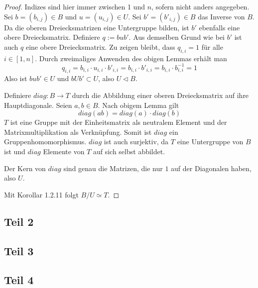 \documentclass[10pt,a4paper]{article}
\begin{document}
\begin{proof}
  Indizes sind hier immer zwischen 1 und $n$, sofern nicht anders angegeben.
  Sei $b = (b_{i, j}) \in B$ und $u = (u_{i, j}) \in U$.
  Sei $b' = (b'_{i, j}) \in B$ das Inverse von $B$.
  Da die oberen Dreiecksmatrizen eine Untergruppe bilden, ist $b'$ ebenfalls eine obere Dreiecksmatrix.
  Definiere $q := bub'$.
  Aus demselben Grund wie bei $b'$ ist auch $q$ eine obere Dreiecksmatrix.
  Zu zeigen bleibt, dass $q_{i, i} = 1$ für alle $i \in [1, n]$.
  Durch zweimaliges Anwenden des obigen Lemmas erhält man
  \begin{equation}
    q_{i, i} = b_{i, i} \cdot u_{i, i} \cdot b'_{i, i} = b_{i, i} \cdot b'_{i, i} = b_{i, i} \cdot b_{i, i}^{-1} = 1
  \end{equation}
  Also ist $bub' \in U$ und $bUb' \subset U$, also $U \triangleleft B$.

  Definiere $diag : B \rightarrow T$ durch die Abbildung einer oberen Dreiecksmatrix auf ihre Hauptdiagonale.
  Seien $a, b \in B$.
  Nach obigem Lemma gilt
  \begin{equation}
    diag(ab) = diag(a) \cdot diag(b)
  \end{equation}
  $T$ ist eine Gruppe mit der Einheitsmatrix als neutralem Element und der Matrixmultiplikation als Verknüpfung.
  Somit ist $diag$ ein Gruppenhomomorphismus.
  $diag$ ist auch surjektiv, da $T$ eine Untergruppe von $B$ ist und $diag$ Elemente von $T$ auf sich selbst abbildet.

  Der Kern von $diag$ sind genau die Matrizen, die nur $1$ auf der Diagonalen haben, also $U$.

  Mit Korollar 1.2.11 folgt $B / U \simeq T$.
\end{proof}

\subsection{Teil 2}

\subsection{Teil 3}

\subsection{Teil 4}
\end{document}
